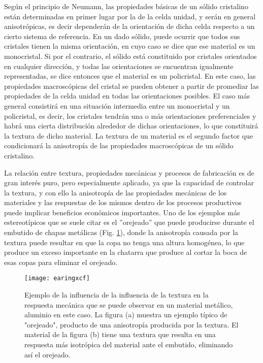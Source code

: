 Según el principio de Neumann\cite{nye1985physical}, las propiedades básicas de un sólido cristalino están determinadas en primer lugar por la de la celda unidad, y serán en general anisotrópicas, es decir dependerán de la orientación de dicha celda respecto a un cierto sistema de referencia.
En un dado sólido, puede ocurrir que todos sus cristales tienen la misma orientación, en cuyo caso se dice que ese material es un monocristal.
Si por el contrario, el sólido está constituido por cristales orientados en cualquier dirección, y todas las orientaciones se encuentran igualmente representadas, se dice entonces que el material es un policristal.
En este caso, las propiedades macroscópicas del cristal se pueden obtener a partir de promediar las propiedades de la celda unidad en todas las orientaciones posibles.
El caso más general consistirá en una situación intermedia entre un monocristal y un policristal, es decir, los cristales tendrán una o más orientaciones preferenciales y habrá una cierta distribución alrededor de dichas orientaciones, lo que constituirá la textura de dicho material. 
La textura de un material es el segundo factor que condicionará la anisotropía de las propiedades macroscópicas de un sólido cristalino.

La relación entre textura, propiedades mecánicas y procesos de fabricación es de gran interés puro, pero especialmente aplicado, ya que la capacidad de controlar la textura, y con ello la anisotropía de las propiedades mecánicas de los materiales y las respuestas de los mismos dentro de los procesos productivos puede implicar beneficios económicos importantes.
Uno de los ejemplos más estereotípicos que se suele citar es el ''orejeado'' que puede producirse durante el embutido de chapas metálicas (Fig. \ref{fig:earing}), donde la anisotropía causada por la textura puede resultar en que la copa no tenga una altura homogénea, lo que produce un exceso importante en la chatarra que produce al cortar la boca de esas copas para eliminar el orejeado.

\begin{figure}[h!]
  \centering
  \texttt{[image: earingxcf]}
  \caption{Ejemplo de la influencia de la influencia de la textura en la respuesta mecánica que se puede observar en un material metálico, aluminio en este caso. La figura (a) muestra un ejemplo típico de "orejeado", producto de una anisotropía producida por la textura. El material de la figura (b) tiene una textura que resulta en una respuesta más isotrópica del material ante el embutido, eliminando así el orejeado. }
  \label{fig:earing}
\end{figure}

